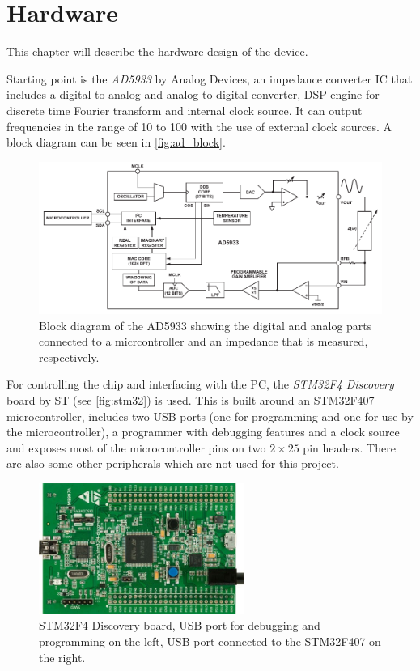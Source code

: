 \chapter{Hardware} \label{sec:hardware}

This chapter will describe the hardware design of the device.

Starting point is the \emph{AD5933} by Analog Devices, an impedance converter IC that includes a digital-to-analog and
analog-to-digital converter, DSP engine for discrete time Fourier transform and internal clock source. It can output
frequencies in the range of \unit{10}{\hertz} to \unit{100}{\kilo\hertz} with the use of external clock sources.
A block diagram can be seen in \autoref{fig:ad_block}.

\begin{figure}[hpb]
  \centering
    \includegraphics[width=\textwidth]{bilder/ad_block.pdf}
  \caption{Block diagram of the AD5933 showing the digital and analog parts connected to a micrcontroller
    and an impedance that is measured, respectively.}
  \label{fig:ad_block}
\end{figure}

For controlling the chip and interfacing with the PC, the \emph{STM32F4 Discovery} board by ST (see \autoref{fig:stm32})
is used. This is built around an STM32F407 microcontroller, includes two USB ports (one for programming and one for use
by the microcontroller), a programmer with debugging features and a clock source and exposes most of the microcontroller
pins on two $ 2 \times 25 $ pin headers. There are also some other peripherals which are not used for this project.

\begin{figure}[htpb]
  \centering
    \includegraphics[width=0.6\textwidth]{bilder/stm32.jpg}
  \caption{STM32F4 Discovery board, USB port for debugging and programming on the left, USB port connected to the
    STM32F407 on the right.}
  \label{fig:stm32}
\end{figure}

